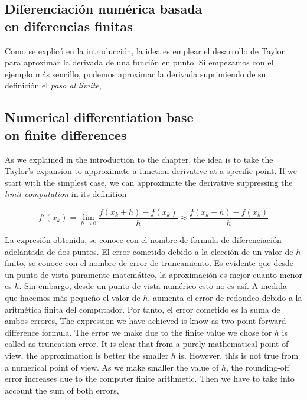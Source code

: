 \begin{paracol}{2}
\subsection{Diferenciación numérica basada\\ en diferencias finitas}
Como se explicó en la introducción, la idea es emplear el desarrollo de Taylor para aproximar la derivada de una función en punto. Si empezamos con el ejemplo más sencillo, podemos aproximar la derivada suprimiendo de su definición el \emph{paso al límite},

\switchcolumn
\subsection{Numerical differentiation base\\ on finite differences}
As we explained in the introduction to the chapter, the idea is to take the Taylor's expansion to approximate a function derivative at a specific point. If we start with the simplest case, we can approximate the derivative suppressing the \emph{limit computation} in its definition
\end{paracol}
\begin{equation*}
f'(x_k)=\lim_{h\rightarrow 0}\frac{f(x_k+h)-f(x_k)}{h} \approx \frac{f(x_k+h)-f(x_k)}{h} 
\end{equation*}
\begin{paracol}{2}
La expresión obtenida, se conoce con el nombre de formula de diferenciación adelantada de dos puntos. El error cometido debido a la elección de un valor de $h$ finito, se conoce con el nombre de error de truncamiento. Es evidente que desde un punto de vista puramente matemático, la aproximación es mejor cuanto menor es $h$. Sin embargo, desde un punto de vista numérico esto no es así. A medida que hacemos más pequeño el valor de $h$, aumenta el error de redondeo debido a la aritmética finita del computador. Por tanto, el error cometido es la suma de ambos errores,
\switchcolumn
The expression we have achieved is know as two-point forward difference formula. The error we make due to the finite value we chose for $h$ is called as truncation error. It is clear that from a purely mathematical point of view, the approximation is better the smaller $h$ is. However, this is not true from a numerical point of view. As we make smaller the value of $h$, the rounding-off error increases due to the computer finite arithmetic. Then we have to take into account the sum of both errors,   
\end{paracol}

